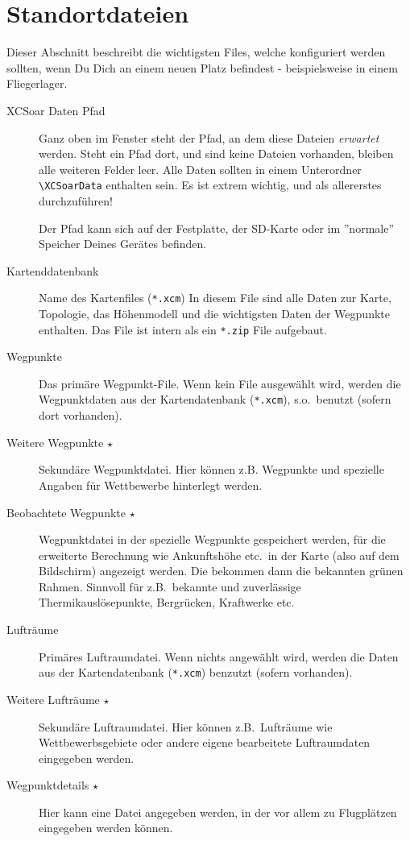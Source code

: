 \section{Standortdateien}\label{sec:site-files}
Dieser Abschnitt beschreibt die wichtigsten Files, welche konfiguriert werden sollten, wenn
Du Dich an einem neuen Platz befindest - beispielsweise in einem Fliegerlager.

\begin{description}
\item[XCSoar Daten Pfad]  Ganz oben im Fenster steht der Pfad, an dem diese Dateien \textsl{erwartet} werden.
Steht ein Pfad dort, und sind keine Dateien vorhanden, bleiben alle weiteren Felder leer.
Alle Daten sollten in einem Unterordner\verb" \XCSoarData" enthalten sein.
Es ist extrem wichtig, und als allererstes durchzuführen!

Der Pfad kann sich auf der Festplatte, der SD-Karte oder im ''normale'' Speicher
Deines Gerätes befinden.
\item[Kartenddatenbank]  Name des Kartenfiles (\verb"*.xcm") In diesem File sind alle Daten zur
Karte, Topologie, das Höhenmodell  und die wichtigsten Daten der Wegpunkte enthalten.
Das File ist intern als ein \verb"*.zip" File aufgebaut.
\item[Wegpunkte]  Das primäre Wegpunkt-File. Wenn kein File ausgewählt wird,
werden die Wegpunktdaten aus der Kartendatenbank (\verb"*.xcm"), s.o.\ benutzt
(sofern dort vorhanden).
\item[Weitere Wegpunkte $\star$]  Sekundäre Wegpunktdatei. Hier können z.B. Wegpunkte und spezielle
Angaben für Wettbewerbe hinterlegt werden.
\item[Beobachtete Wegpunkte $\star$]  Wegpunktdatei in der spezielle Wegpunkte gespeichert werden,
für die erweiterte Berechnung wie Ankunftshöhe etc.\  in der Karte (also auf dem Bildschirm)
angezeigt werden. Die bekommen dann die bekannten grünen Rahmen.
Sinnvoll für z.B.\ bekannte und zuverlässige Thermikauslösepunkte, Bergrücken, Kraftwerke etc.\
\item[Lufträume]  Primäres Luftraumdatei. Wenn nichts angewählt wird, werden die Daten aus der
Kartendatenbank (\verb"*.xcm") benzutzt (sofern vorhanden).
\item[Weitere Lufträume $\star$]  Sekundäre Luftraumdatei. Hier  können z.B.\ Lufträume wie
Wettbewerbsgebiete oder andere eigene bearbeitete Luftraumdaten  eingegeben werden.
\item[Wegpunktdetails $\star$]  Hier kann eine Datei angegeben werden, in der vor allem
 zu  Flugplätzen eingegeben werden können.
\end{description}

